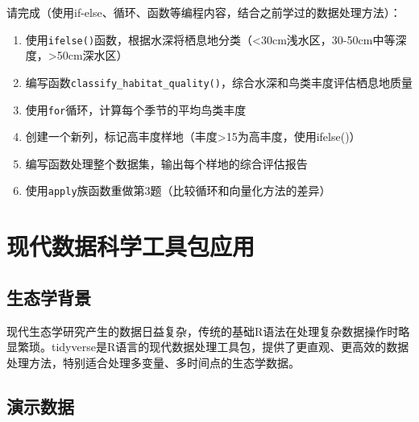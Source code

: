 \documentclass[
  twoside]{book}
\begin{document}
请完成（使用if-else、循环、函数等编程内容，结合之前学过的数据处理方法）：

\begin{enumerate}
\def\labelenumi{\arabic{enumi}.}
\item
  使用\texttt{ifelse()}函数，根据水深将栖息地分类（\textless30cm浅水区，30-50cm中等深度，\textgreater50cm深水区）
\item
  编写函数\texttt{classify\_habitat\_quality()}，综合水深和鸟类丰度评估栖息地质量
\item
  使用\texttt{for}循环，计算每个季节的平均鸟类丰度
\item
  创建一个新列，标记高丰度样地（丰度\textgreater15为高丰度，使用ifelse()）
\item
  编写函数处理整个数据集，输出每个样地的综合评估报告
\item
  使用\texttt{apply}族函数重做第3题（比较循环和向量化方法的差异）
\end{enumerate}

\hypertarget{ux73b0ux4ee3ux6570ux636eux79d1ux5b66ux5de5ux5177ux5305ux5e94ux7528}{%
\section{现代数据科学工具包应用}\label{ux73b0ux4ee3ux6570ux636eux79d1ux5b66ux5de5ux5177ux5305ux5e94ux7528}}

\hypertarget{ux751fux6001ux5b66ux80ccux666f-8}{%
\subsection{生态学背景}\label{ux751fux6001ux5b66ux80ccux666f-8}}

现代生态学研究产生的数据日益复杂，传统的基础R语法在处理复杂数据操作时略显繁琐。tidyverse是R语言的现代数据处理工具包，提供了更直观、更高效的数据处理方法，特别适合处理多变量、多时间点的生态学数据。

\hypertarget{ux6f14ux793aux6570ux636e-7}{%
\subsection{演示数据}\label{ux6f14ux793aux6570ux636e-7}}
\end{document}
